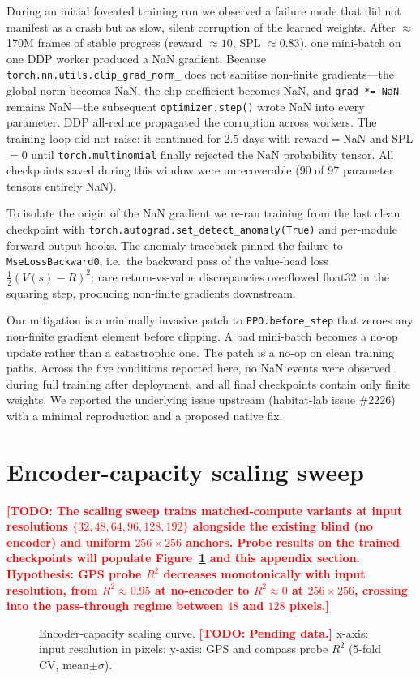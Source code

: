 \documentclass{article}
\newcommand{\TODO}[1]{\textcolor{red}{\textbf{[TODO: #1]}}}
\begin{document}
During an initial foveated training run we observed a failure mode that did not manifest as a crash but as slow, silent corruption of the learned weights. After $\approx$170M frames of stable progress (reward $\approx 10$, SPL $\approx 0.83$), one mini-batch on one DDP worker produced a NaN gradient. Because \verb|torch.nn.utils.clip_grad_norm_| does not sanitise non-finite gradients---the global norm becomes NaN, the clip coefficient becomes NaN, and \verb|grad *= NaN| remains NaN---the subsequent \verb|optimizer.step()| wrote NaN into every parameter. DDP all-reduce propagated the corruption across workers. The training loop did not raise: it continued for 2.5 days with reward$=$NaN and SPL$=0$ until \verb|torch.multinomial| finally rejected the NaN probability tensor. All checkpoints saved during this window were unrecoverable (90 of 97 parameter tensors entirely NaN).

To isolate the origin of the NaN gradient we re-ran training from the last clean checkpoint with \verb|torch.autograd.set_detect_anomaly(True)| and per-module forward-output hooks. The anomaly traceback pinned the failure to \verb|MseLossBackward0|, i.e.\ the backward pass of the value-head loss $\tfrac{1}{2}(V(s) - R)^2$; rare return-vs-value discrepancies overflowed float32 in the squaring step, producing non-finite gradients downstream.

Our mitigation is a minimally invasive patch to \verb|PPO.before_step| that zeroes any non-finite gradient element before clipping. A bad mini-batch becomes a no-op update rather than a catastrophic one. The patch is a no-op on clean training paths. Across the five conditions reported here, no NaN events were observed during full training after deployment, and all final checkpoints contain only finite weights. We reported the underlying issue upstream (habitat-lab issue \#2226) with a minimal reproduction and a proposed native fix.


\section{Encoder-capacity scaling sweep}
\label{app:scaling}

\TODO{The scaling sweep trains matched-compute variants at input
resolutions $\{32, 48, 64, 96, 128, 192\}$ alongside the existing blind
(no encoder) and uniform $256{\times}256$ anchors. Probe results on the
trained checkpoints will populate Figure~\ref{fig:scaling} and this
appendix section. Hypothesis: GPS probe $R^2$ decreases monotonically
with input resolution, from $R^2 \approx 0.95$ at no-encoder to
$R^2 \approx 0$ at $256{\times}256$, crossing into the pass-through
regime between $48$ and $128$ pixels.}

\begin{figure}[h]
\centering
\fbox{\rule{0pt}{4cm}\rule{0.8\linewidth}{0pt}}
\caption{Encoder-capacity scaling curve. \TODO{Pending data.} x-axis: input resolution in pixels; y-axis: GPS and compass probe $R^2$ (5-fold CV, mean$\pm\sigma$).}
\label{fig:scaling}
\end{figure}
\end{document}
